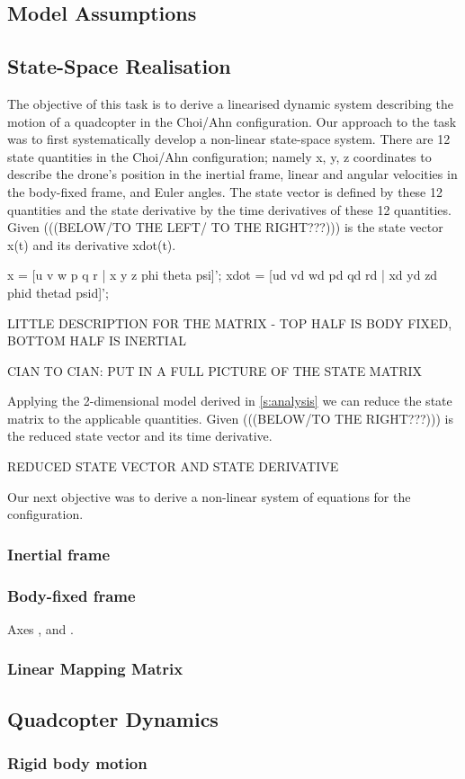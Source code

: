 \subsection{Model Assumptions}\label{s:modassumptions}

\subsection{State-Space Realisation}
The objective of this task is to derive a linearised dynamic system describing the motion of a quadcopter in the Choi/Ahn configuration. Our approach to the task was to first systematically develop a non-linear state-space system. There are 12 state quantities in the Choi/Ahn configuration; namely x, y, z coordinates to describe the drone's position in the inertial frame, linear and angular velocities in the body-fixed frame, and Euler angles. The state vector is defined by these 12 quantities and the state derivative by the time derivatives of these 12 quantities. Given (((BELOW/TO THE LEFT/ TO THE RIGHT???))) is the state vector x(t) and its derivative xdot(t).

x = [u v w p q r | x y z phi theta psi]';
xdot = [ud vd wd pd qd rd | xd yd zd phid thetad psid]';

LITTLE DESCRIPTION FOR THE MATRIX - TOP HALF IS BODY FIXED, BOTTOM HALF IS INERTIAL

CIAN TO CIAN: PUT IN A FULL PICTURE OF THE STATE MATRIX

Applying the 2-dimensional model derived in \cref{s:analysis} we can reduce the state matrix to the applicable quantities. Given (((BELOW/TO THE RIGHT???))) is the reduced state vector and its time derivative.

REDUCED STATE VECTOR AND STATE DERIVATIVE

Our next objective was to derive a non-linear system of equations for the configuration.

\subsubsection[Inertial frame]{Inertial frame } %
\subsubsection[Body-fixed frame]{Body-fixed frame }
Axes ,  and .
\subsubsection[Linear Mapping Matrix]{Linear Mapping Matrix }
\label{sss:lmapmatQ}

\subsection{Quadcopter Dynamics}
\subsubsection{Rigid body motion}
\label{rigid-body-motion}
